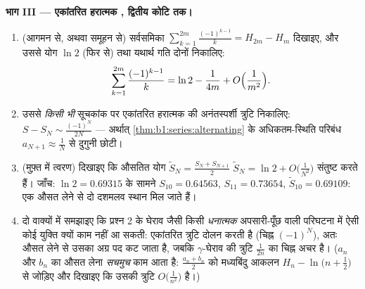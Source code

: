 \begin{problem}[{सप्ताहांत समस्या --- $H_n = \ln n + \gamma +
\frac{1}{2n} + O(n^{-2})$, और $1 - \frac12 +
\frac13 - \dots$ को पुनर्क्रमित करके $\frac{\ln 2}{2}$}]
\medskip \noindent\textbf{भाग III --- एकांतरित हरात्मक , द्वितीय कोटि
तक।}
\begin{enumerate}[resume]
  \item (आगमन से, अथवा समूहन से) सर्वसमिका $\sum_{k=1}^{2m}
  \frac{(-1)^{k-1}}{k} = H_{2m} - H_m$ दिखाइए, और उससे योग $\ln 2$ (फिर से)
  तथा यथार्थ गति दोनों निकालिए:
        \[
        \sum_{k=1}^{2m} \frac{(-1)^{k-1}}{k}
        = \ln 2 - \frac{1}{4m} + O\Bigl(\frac{1}{m^2}\Bigr) .
        \]
  \item उससे \emph{किसी भी} सूचकांक पर एकांतरित हरात्मक  की
  अनंतस्पर्शी त्रुटि निकालिए: $S - S_N \sim \frac{(-1)^N}{2N}$ --- अर्थात्
  \cref{thm:b1:series:alternating} के अधिकतम-स्थिति परिबंध $a_{N+1} \approx
  \frac1N$ से दुगुनी छोटी।
  \item (मुफ़्त में त्वरण) दिखाइए कि औसतित योग $\tilde S_N = \frac{S_N +
  S_{N+1}}{2}$ $\tilde S_N = \ln 2 + O\bigl(\frac{1}{N^2}\bigr)$ संतुष्ट
  करते हैं। जाँच: $\ln 2 = 0.69315$ के सामने $S_{10} = 0.64563$, $S_{11} =
  0.73654$, $\tilde S_{10} = 0.69109$: एक औसत लेने से दो दशमलव स्थान मिल
  जाते हैं।
  \item दो वाक्यों में समझाइए कि प्रश्न 2 के घेराव जैसी किसी \emph{धनात्मक}
  अपसारी-पूँछ वाली परिघटना में ऐसी कोई युक्ति क्यों काम नहीं आ सकती:
  एकांतरित त्रुटि दोलन करती है (चिह्न $(-1)^N$), अतः औसत लेने से उसका अग्र
  पद कट जाता है, जबकि $\gamma$-घेराव की त्रुटि $\frac{1}{2n}$ का चिह्न अचर
  है। ($a_n$ और $b_n$ का औसत लेना \emph{सचमुच} काम आता है: $\frac{a_n +
  b_n}{2}$ को मध्यबिंदु आकलन $H_n - \ln\bigl(n + \frac12\bigr)$ से जोड़िए और
  दिखाइए कि उसकी त्रुटि $O\bigl(\frac{1}{n^2}\bigr)$ है।)
\end{enumerate}


\end{problem}
